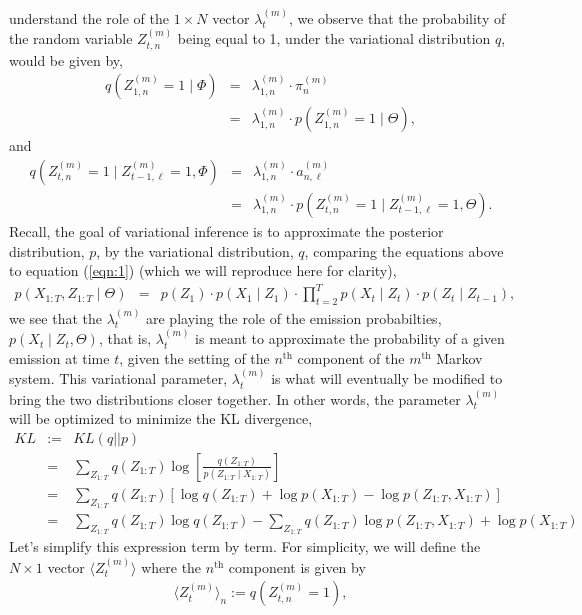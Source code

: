 \documentclass{amsart}
\begin{document}
understand the role of the $1\times N$ vector $\lambda_t^{(m)}$, we observe that the probability of the random 
variable $Z_{t,n}^{(m)}$ being equal to 1, under the variational
distribution $q$, would be given by,
\begin{eqnarray*}
q(Z_{1,n}^{(m)} = 1\mid \Phi) &=& \lambda_{1,n}^{(m)}\cdot \pi_n^{(m)} \\
& = &  
\lambda_{1,n}^{(m)}\cdot p(Z_{1,n}^{(m)} = 1\mid \Theta),
\end{eqnarray*}
and 
\begin{eqnarray*}
q(Z_{t,n}^{(m)}=1\mid Z_{t-1,\ell}^{(m)} =1, \Phi) &=&  
\lambda_{1,n}^{(m)}\cdot a_{n,\ell}^{(m)}\\
& = & \lambda_{1,n}^{(m)}\cdot p(Z_{t,n}^{(m)}=1\mid 
Z_{t-1,\ell}^{(m)}=1,\Theta).
\end{eqnarray*}
Recall, the goal of variational inference is to approximate 
the posterior distribution, $p$, by the variational distribution, $q$, 
comparing the equations above to equation 
(\ref{eqn:1}) (which we will reproduce here for clarity),
\begin{eqnarray*}
p(X_{1:T},Z_{1:T}\mid \Theta) & = & p(Z_1)\cdot p(X_1\mid Z_1)\cdot 
\prod_{t=2}^Tp(X_t\mid Z_t)\cdot p(Z_t\mid Z_{t-1}),
\end{eqnarray*} 
we see that the $\lambda_t^{(m)}$ are playing the role of the 
emission probabilties, $p(X_t\mid Z_t, \Theta)$, that is, 
$\lambda_t^{(m)}$ is meant to approximate the probability of a given 
emission at time $t$, given the setting of the $n^\text{th}$ component 
of the $m^\text{th}$ Markov system.  This variational parameter, 
$\lambda_t^{(m)}$ is what will eventually be modified to bring the two 
distributions closer together.  In other words, the parameter $\lambda_t^{(m)}$ 
will be optimized to minimize the KL divergence, 
\begin{eqnarray*}
KL&:=&KL(q||p)\\
 &=& \sum_{Z_{1:T}}q(Z_{1:T})\log\left[\frac{q(Z_{1:T})}{p(Z_{1:T}\mid 
X_{1:T})}\right]\\
& = & \sum_{Z_{1:T}}q(Z_{1:T})\left[\log q(Z_{1:T}) + \log p( 
X_{1:T}) - \log p(Z_{1:T},X_{1:T})\right]\\
& = & \sum_{Z_{1:T}}q(Z_{1:T})\log q(Z_{1:T}) - 
\sum_{Z_{1:T}}q(Z_{1:T})\log p(Z_{1:T},X_{1:T}) + \log p( 
X_{1:T}) 
\end{eqnarray*} 
Let's simplify this expression term by term. For simplicity, we will define the $N\times 1$ vector $\langle 
Z_t^{(m)}\rangle$ where the $n^\text{th}$ component is given by 
\begin{eqnarray*}
\langle Z_t^{(m)}\rangle_n := q(Z_{t,n}^{(m)} = 1),
\end{eqnarray*}
\end{document}

